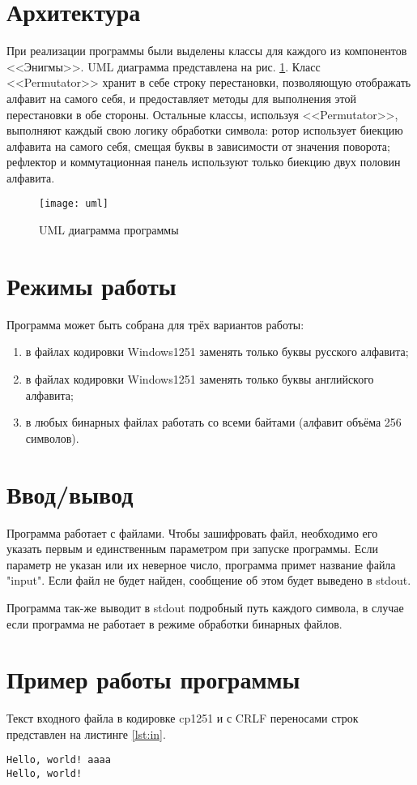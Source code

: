 \documentclass[14pt, oneside, a4paper]{extreport}
\begin{document}
\section{Архитектура}
При реализации программы были выделены классы для каждого из компонентов <<Энигмы>>. UML диаграмма представлена на рис. \ref{fig:uml}. Класс <<Permutator>> хранит в себе строку перестановки, позволяющую отображать алфавит на самого себя, и предоставляет методы для выполнения этой перестановки в обе стороны. Остальные классы, используя <<Permutator>>, выполняют каждый свою логику обработки символа: ротор использует биекцию алфавита на самого себя, смещая буквы в зависимости от значения поворота; рефлектор и коммутационная панель используют только биекцию двух половин алфавита.

\begin{figure}[!ht]
    \texttt{[image: uml]}
    \caption{UML диаграмма программы}
    \label{fig:uml}
\end{figure}

\section{Режимы работы}
Программа может быть собрана для трёх вариантов работы:
\begin{enumerate}
    \item в файлах кодировки Windows1251 заменять только буквы русского алфавита;
    \item в файлах кодировки Windows1251 заменять только буквы английского алфавита;
    \item в любых бинарных файлах работать со всеми байтами (алфавит объёма 256 символов).
\end{enumerate}

\section{Ввод/вывод}
Программа работает с файлами. Чтобы зашифровать файл, необходимо его указать первым и единственным параметром при запуске программы. Если параметр не указан или их неверное число, программа примет название файла "input". Если файл не будет найден, сообщение об этом будет выведено в stdout.

Программа так-же выводит в stdout подробный путь каждого символа, в случае если программа не работает в режиме обработки бинарных файлов.

\section{Пример работы программы}
Текст входного файла в кодировке cp1251 и с CRLF переносами строк представлен на листинге \ref{lst:in}.
\begin{lstlisting}[caption={Входной файл}, label={lst:in}]
Hello, world! aaaa
Hello, world!
\end{lstlisting}
\end{document}
